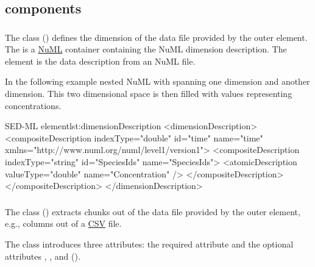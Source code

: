 \subsection{ components}
\label{class:dataDescriptionComponents}


\subsubsection{}
\label{class:dimensionDescription}
The  class () defines the dimension of the data file provided by the outer \SedDataDescription element. The  is a \hyperref[sec:numl]{NuML} container containing the NuML dimension description. The \hyperref[sec:dimensionDescription]{} element is the data description from an NuML file. 

In the following example nested NuML  with  spanning one dimension and  another dimension. This two dimensional space is then filled with  values representing concentrations.

\begin{myXmlLst}{SED-ML  element}{lst:dimensionDescription}
<dimensionDescription>
	<compositeDescription indexType="double" id="time" name="time" 
		xmlns="http://www.numl.org/numl/level1/version1">
		<compositeDescription indexType="string" id="SpeciesIds" name="SpeciesIds">
			<atomicDescription valueType="double" name="Concentration" />
		</compositeDescription>
	</compositeDescription>
</dimensionDescription>
\end{myXmlLst} 

\subsubsection{}
\label{class:dataSource}
The  class () extracts chunks out of the data file provided by the outer \SedDataDescription element, e.g., columns out of a \hyperref[sec:dataFormatCSV]{CSV} file.

The  class introduces three attributes: the required attribute \hyperref[sec:id]{} and the optional attributes \hyperref[sec:name]{}, \hyperref[sec:indexSet]{}, and \hyperref[sec:listOfSlices]{} ().

